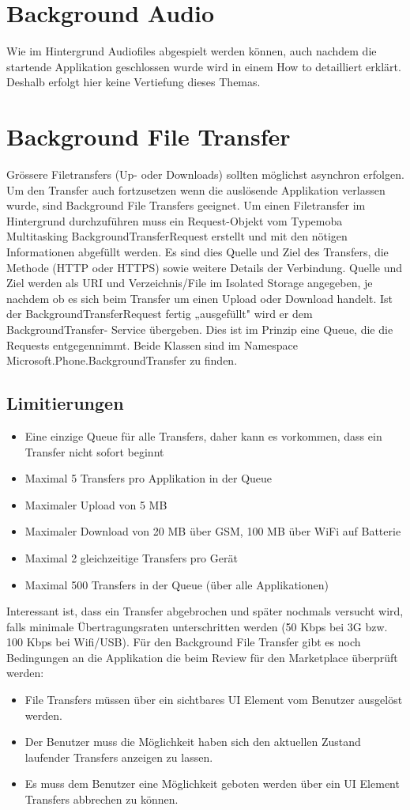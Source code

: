 \documentclass[a4paper,10pt]{scrreprt}
\begin{document}
\section{Background Audio}
Wie im Hintergrund Audiofiles abgespielt werden können, auch nachdem die startende Applikation geschlossen
wurde wird in einem How to detailliert erklärt. Deshalb erfolgt hier keine Vertiefung dieses Themas.
\section{Background File Transfer}
Grössere Filetransfers (Up- oder Downloads) sollten möglichst asynchron erfolgen. Um den Transfer auch
fortzusetzen wenn die auslösende Applikation verlassen wurde, sind Background File Transfers geeignet. Um
einen Filetransfer im Hintergrund durchzuführen muss ein Request-Objekt vom Typemoba
Multitasking
BackgroundTransferRequest erstellt und mit den nötigen Informationen abgefüllt werden. Es sind dies
Quelle und Ziel des Transfers, die Methode (HTTP oder HTTPS) sowie weitere Details der Verbindung. Quelle
und Ziel werden als URI und Verzeichnis/File im Isolated Storage angegeben, je nachdem ob es sich beim
Transfer um einen Upload oder Download handelt.
Ist der BackgroundTransferRequest fertig „ausgefüllt" wird er dem BackgroundTransfer-
Service übergeben. Dies ist im Prinzip eine Queue, die die Requests entgegennimmt. Beide Klassen sind im
Namespace Microsoft.Phone.BackgroundTransfer zu finden.
\subsection{Limitierungen}
\begin{itemize}
\item Eine einzige Queue für alle Transfers, daher kann es vorkommen, dass ein Transfer nicht sofort beginnt
\item Maximal 5 Transfers pro Applikation in der Queue
\item Maximaler Upload von 5 MB
\item Maximaler Download von 20 MB über GSM, 100 MB über WiFi auf Batterie
\item Maximal 2 gleichzeitige Transfers pro Gerät
\item Maximal 500 Transfers in der Queue (über alle Applikationen) 
\end{itemize}
Interessant ist, dass ein Transfer abgebrochen und später nochmals versucht wird, falls minimale
Übertragungsraten unterschritten werden (50 Kbps bei 3G bzw. 100 Kbps bei Wifi/USB).
Für den Background File Transfer gibt es noch Bedingungen an die Applikation die beim Review für den
Marketplace überprüft werden:
\begin{itemize}
\item File Transfers müssen über ein sichtbares UI Element vom Benutzer ausgelöst werden.
\item Der Benutzer muss die Möglichkeit haben sich den aktuellen Zustand laufender Transfers anzeigen zu
lassen.
\item Es muss dem Benutzer eine Möglichkeit geboten werden über ein UI Element Transfers abbrechen zu
können.
\end{itemize}
\end{document}
